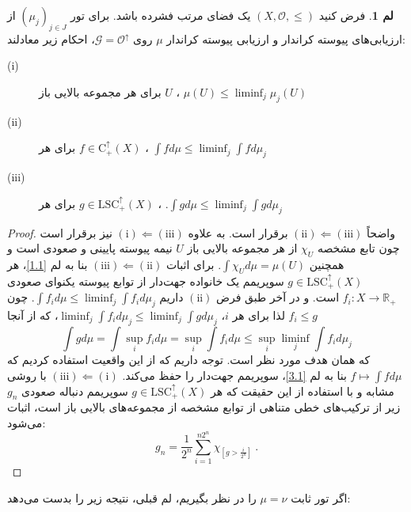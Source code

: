 \documentclass[12pt,a4paper]{article}
\theoremstyle{definition}
\theoremstyle{theorem}
\newtheorem{lemma}[definition]{لم}
\theoremstyle{definition}
\newcommand{\bR}{\mathbb{R}}
\newcommand{\cO}{\mathcal{O}}
\newcommand{\cG}{\mathcal{G}}
\begin{document}
\begin{lemma}\label{3.2} 
فرض کنید 
$ (X,\cO,\leq) $
یک فضای مرتب فشرده باشد.  برای تور
$ (\mu_{j})_{j\in J} $
از ارزیابی‌های پیوسته کراندار و  ارزیابی پیوسته کراندار 
$ \mu $
روی 
$ \cG=\cO^{\uparrow} $، احکام زیر معادلند:
\begin{description}
\item[(i)]
 برای هر مجموعه بالایی باز 
$U $%
،
  $ \mu(U)\leq \liminf_{j}\mu_{j}(U) $
 
\item[(ii)] 
برای هر
$  f\in \mathrm{C}_{+}^{\uparrow}(X) $%
،
$ \int{f}d\mu\leq \liminf_{j}\int{f}d\mu_{j} $
 
\item[(iii)] 
برای هر
$ g\in \mathrm{LSC}_{+}^{\uparrow}(X) $%
،
$ .\int{g}d\mu\leq \liminf_{j}\int{g}d\mu_{j} $
 
\end{description}

\end{lemma}
\begin{proof}
واضحاً
$ \mathrm{(ii)}\Leftarrow \mathrm{(iii)} $
برقرار است. به علاوه 
$ \mathrm{(i)}\Leftarrow \mathrm{(iii)} $
نیز برقرار است چون تابع مشخصه 
$  \chi_{U}$
از هر مجموعه بالایی باز 
$ U $
نیمه پیوسته پایینی و صعودی است و همچنین 
$. \int{\chi_{U}}d\mu=\mu(U) $
برای اثبات 
$ \mathrm{(iii)} \Leftarrow \mathrm{(ii)}$
 بنا به لم
\ref{1.1}، هر 
$ g\in \mathrm{LSC}_{+}^{\uparrow}(X) $
سوپریمم یک خانواده جهت‌دار  از توابع  پیوسته  یکنوای صعودی
$ f_{i}:X\rightarrow \bR_{+} $
  است.
و در آخر طبق فرض 
$\mathrm{(ii)}$
داریم 
$  \int{f_{i}}d\mu\leq \liminf_{j}\int{f_{i}}d\mu_{j}  $. چون 
$ f_{i}\leq g $
لذا برای هر 
$ i $،  
$ \liminf_{j}\int{f_{i}}d\mu_{j}\leq \liminf_{j}\int{g}d\mu_{j} $،  که از آنجا
$$ \int{g}d\mu=\int{\sup_{i}f_{i}}d\mu=\sup_{i}\int f_{i}d\mu\leq \sup_{i}\liminf_{j}\int{f_{i}}d\mu_{j}$$
که همان هدف مورد نظر است. توجه داریم که از این واقعیت استفاده کردیم که 
\linebreak
$ f\mapsto \int{f}d\mu $
بنا به لم
 \ref{3.1}،  سوپریمم جهت‌دار را حفظ می‌کند.  
$ \mathrm{(iii)} \Leftarrow \mathrm{(i)}$
با روشی مشابه و با استفاده از این حقیقت که هر 
$ g\in \mathrm{LSC}_{+}^{\uparrow}(X) $
سوپریمم دنباله صعودی 
$ g_{n} $
زیر از ترکیب‌های خطی متناهی از توابع مشخصه از مجموعه‌های بالایی باز است،  اثبات می‌شود:
$$ g_{n}=\dfrac{1}{2^{n}}\sum_{i=1}^{n2^{n}}\chi_{[ g> \frac{i}{2^{n}}]} \  .$$
\end{proof}
اگر تور ثابت 
$ \mu=\nu $
را در نظر بگیریم، لم قبلی، نتیجه زیر را بدست می‌دهد:
\end{document}
